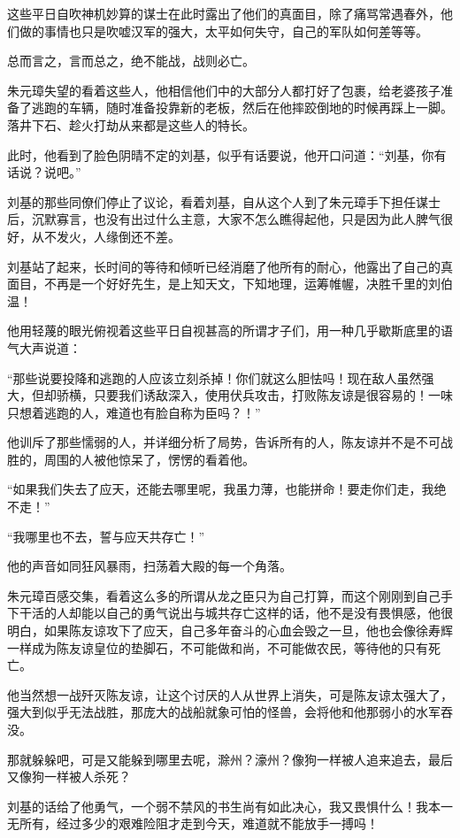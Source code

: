 \begin{multicols}{\theparacolNo}
		这些平日自吹神机妙算的谋士在此时露出了他们的真面目，除了痛骂常遇春外，他们做的事情也只是吹嘘汉军的强大，太平如何失守，自己的军队如何差等等。

		总而言之，言而总之，绝不能战，战则必亡。

		朱元璋失望的看着这些人，他相信他们中的大部分人都打好了包裹，给老婆孩子准备了逃跑的车辆，随时准备投靠新的老板，然后在他摔跤倒地的时候再踩上一脚。落井下石、趁火打劫从来都是这些人的特长。

		此时，他看到了脸色阴晴不定的刘基，似乎有话要说，他开口问道：“刘基，你有话说？说吧。”

		刘基的那些同僚们停止了议论，看着刘基，自从这个人到了朱元璋手下担任谋士后，沉默寡言，也没有出过什么主意，大家不怎么瞧得起他，只是因为此人脾气很好，从不发火，人缘倒还不差。

		刘基站了起来，长时间的等待和倾听已经消磨了他所有的耐心，他露出了自己的真面目，不再是一个好好先生，是上知天文，下知地理，运筹帷幄，决胜千里的刘伯温！

		他用轻蔑的眼光俯视着这些平日自视甚高的所谓才子们，用一种几乎歇斯底里的语气大声说道：

		“那些说要投降和逃跑的人应该立刻杀掉！你们就这么胆怯吗！现在敌人虽然强大，但却骄横，只要我们诱敌深入，使用伏兵攻击，打败陈友谅是很容易的！一味只想着逃跑的人，难道也有脸自称为臣吗？！”

		他训斥了那些懦弱的人，并详细分析了局势，告诉所有的人，陈友谅并不是不可战胜的，周围的人被他惊呆了，愣愣的看着他。

		“如果我们失去了应天，还能去哪里呢，我虽力薄，也能拼命！要走你们走，我绝不走！”

		“我哪里也不去，誓与应天共存亡！”

		他的声音如同狂风暴雨，扫荡着大殿的每一个角落。

		朱元璋百感交集，看着这么多的所谓从龙之臣只为自己打算，而这个刚刚到自己手下干活的人却能以自己的勇气说出与城共存亡这样的话，他不是没有畏惧感，他很明白，如果陈友谅攻下了应天，自己多年奋斗的心血会毁之一旦，他也会像徐寿辉一样成为陈友谅皇位的垫脚石，不可能做和尚，不可能做农民，等待他的只有死亡。

		他当然想一战歼灭陈友谅，让这个讨厌的人从世界上消失，可是陈友谅太强大了，强大到似乎无法战胜，那庞大的战船就象可怕的怪兽，会将他和他那弱小的水军吞没。

		那就躲躲吧，可是又能躲到哪里去呢，滁州？濠州？像狗一样被人追来追去，最后又像狗一样被人杀死？

		刘基的话给了他勇气，一个弱不禁风的书生尚有如此决心，我又畏惧什么！我本一无所有，经过多少的艰难险阻才走到今天，难道就不能放手一搏吗！


\end{multicols}
